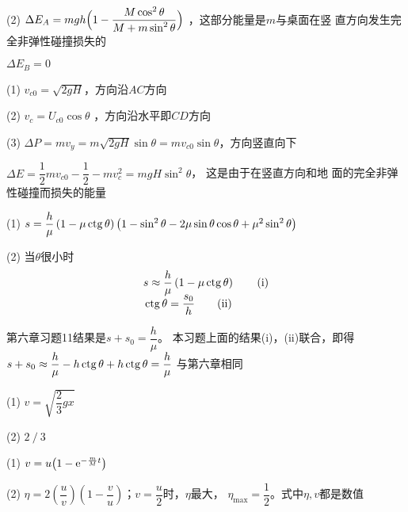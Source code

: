 (2) $\Delta E_{A}=m g h\Bigl(1-\dfrac{M \cos ^{2} \theta}{M+m \sin ^{2} \theta} \Bigr)$
，这部分能量是$ m $与桌面在竖
直方向发生完全非弹性碰撞损失的

\aindent $ \Delta E _ { B } = 0 $

\answer (1) $ v _ { c0 } = \sqrt { 2 g H } $，方向沿$ AC $方向

(2) $ v _ { c } = U _ { c0 } \cos \theta $ ，方向沿水平即$ CD $方向

(3) $ \Delta P = m v _ { y } = m \sqrt { 2 g H } \sin \theta = m v _ { c0 } \sin \theta $，方向竖直向下

$ \Delta E = \dfrac { 1 } { 2 } m v _ { c0 } - \dfrac { 1 } { 2 } - m v _ { c } ^ { 2 } = m g H \sin ^ { 2 } \theta $， 这是由于在竖直方向和地
面的完全非弹性碰撞而损失的能量

\answer (1) $ s = \dfrac { h } { \mu } \left( 1 - \mu \operatorname{ctg} \theta \right) \left( 1 - \sin ^ 2 \theta - 2 \mu \sin \theta \cos \theta + \mu ^ { 2 } \sin ^ { 2 } \theta \right) $

(2) 当$ \theta $很小时%
\begin{align}
   & s \approx \frac { h } { \mu } \left( 1 - \mu \operatorname{ctg} \theta \right) \tag{i} \\[-0.5em]
   & \operatorname{ctg} \theta = \frac { s _ { 0 } } { h } \tag{ii}
\end{align}

第六章习题11结果是$ s + s _ { 0 } = \dfrac { h } { \mu } $。
本习题上面的结果(i)，(ii)联合，即得
$ s + s _ { 0 } \approx \dfrac { h } { \mu } - h \operatorname{ctg} \theta + h \operatorname{ctg} \theta = \dfrac { h } { \mu } $
与第六章相同

\answer (1) $ v = \sqrt { \dfrac{ 2 } { 3 } g x } $

(2) $ 2 \operatorname{/} 3 $

\answer (1) $ v = u \bigl( 1 - \mathrm e ^ { - \frac { m } { M } t } \bigr) $

(2) $ \eta = 2 \left( \dfrac { u } { v } \right) \left( 1 - \dfrac { v } { u } \right) $；$ v = \dfrac { u } { 2 } $时，$\eta$最大， $ \eta _ { \text{max}} = \dfrac { 1 } { 2 } $。式中$ \eta, v $都是数值
